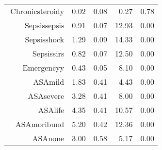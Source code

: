 \begin{tabular}{rrrrr}
$$  Chronic\-steroid\-y & 0.02 & 0.08 & 0.27 & 0.78 \\ 
  Sepsis\-sepsis & 0.91 & 0.07 & 12.93 & 0.00 \\ 
  Sepsis\-shock & 1.29 & 0.09 & 14.33 & 0.00 \\ 
  Sepsis\-sirs & 0.82 & 0.07 & 12.50 & 0.00 \\ 
  Emergency\-y & 0.43 & 0.05 & 8.10 & 0.00 \\ 
  ASA\-mild & 1.83 & 0.41 & 4.43 & 0.00 \\ 
  ASA\-severe & 3.28 & 0.41 & 8.00 & 0.00 \\ 
  ASA\-life & 4.35 & 0.41 & 10.57 & 0.00 \\ 
  ASA\-moribund & 5.20 & 0.42 & 12.36 & 0.00 \\ 
  ASA\-none & 3.00 & 0.58 & 5.17 & 0.00 \\ 
   \hline
\end{tabular}


